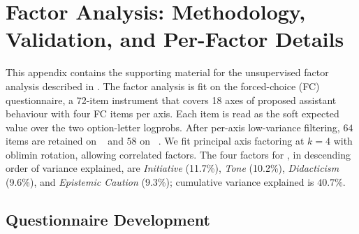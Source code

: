 \section{Factor Analysis: Methodology, Validation, and Per-Factor Details}\label{sec:appendix-fa-factors}

This appendix contains the supporting material for the unsupervised factor analysis described in .
The factor analysis is fit on the forced-choice (FC) questionnaire, a 72-item instrument that covers 18 axes of proposed assistant behaviour with four FC items per axis. Each item is read as the soft expected value over the two option-letter logprobs.
After per-axis low-variance filtering, $64$ items are retained on \LlamaThreePointOneSizeEightBInstruct~\citep{grattafiori2024llama} and $58$ on \QwenTwoPointFiveSizeSevenBInstruct~\citep{qwen2024qwen25}.
We fit principal axis factoring at $k=4$ with oblimin rotation, allowing correlated factors. The four factors for \LlamaThreePointOneSizeEightBInstruct, in descending order of variance explained, are \textit{Initiative} (11.7\%), \textit{Tone} (10.2\%), \textit{Didacticism} (9.6\%), and \textit{Epistemic Caution} (9.3\%); cumulative variance explained is $40.7\%$.

\subsection{Questionnaire Development}\label{sec:appendix-fa-questionnaire-dev}

